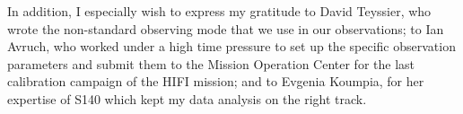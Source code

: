 In addition, I especially wish to express my gratitude to David Teyssier, who wrote the non-standard observing mode that we use in our observations;
to Ian Avruch, who worked under a high time pressure to set up the specific observation parameters and submit them to the Mission Operation Center for the last calibration campaign of the HIFI mission;
and to Evgenia Koumpia, for her expertise of S140 which kept my data analysis on the right track.

